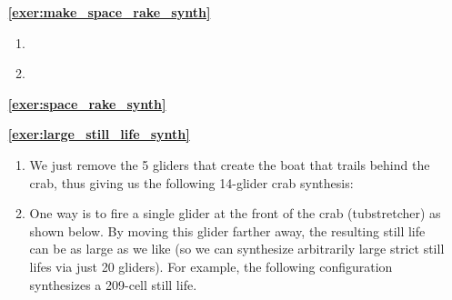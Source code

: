 \begin{multicols}{2}
\begin{itemize}[leftmargin=0em]
\begin{enumerate}[leftmargin=1.5em,label=\bf\color{ocre}(\alph*)]
			\item {} \\
		\end{enumerate}
		
		
		\item[\bf\color{ocre}\sffamily\ref{exer:make_space_rake_synth}]
		\begin{enumerate}[leftmargin=1.5em,label=\bf\color{ocre}(\alph*)]
			\item {} \\
			
			\item {} \\
		\end{enumerate}
		
		
		\item[\bf\color{ocre}\sffamily\ref{exer:space_rake_synth}]  \\[2cm]%
		
		
		\item[\bf\color{ocre}\sffamily\ref{exer:large_still_life_synth}]
		\begin{enumerate}[leftmargin=1.5em,label=\bf\color{ocre}(\alph*),series=solu_one_time]
			\item We just remove the 5 gliders that create the boat that trails behind the crab, thus giving us the following 14-glider crab synthesis:
			\begin{center}
			\end{center}
			
			\item One way is to fire a single glider at the front of the crab (tubstretcher) as shown below. By moving this glider farther away, the resulting still life can be as large as we like (so we can synthesize arbitrarily large strict still lifes via just 20 gliders). For example, the following configuration synthesizes a 209-cell still life.
			\begin{center}
				 \\
			\end{center}
		\end{enumerate}
		

\end{itemize}
\end{multicols}
